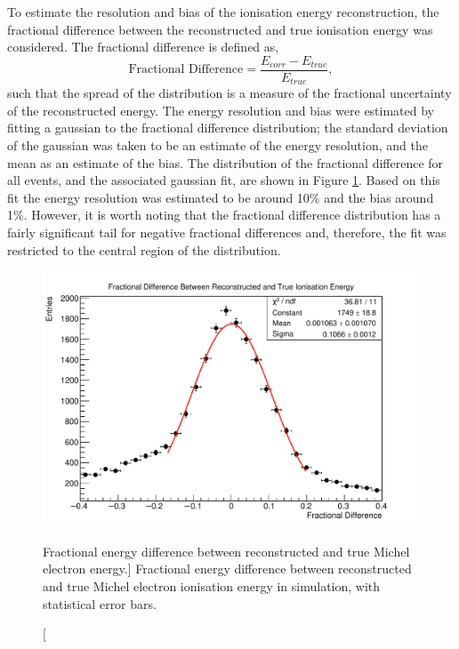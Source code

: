 To estimate the resolution and bias of the ionisation energy reconstruction, the
fractional difference between the reconstructed and true ionisation energy was
considered. The fractional difference is defined as,
\begin{equation*}
	\mbox{Fractional Difference} = \frac{E_{corr} - E_{true}}{E_{true}},
\end{equation*}
such that the spread of the distribution is a measure of the fractional
uncertainty of the reconstructed energy. The energy resolution and bias were
estimated by fitting a gaussian to the fractional difference distribution; the
standard deviation of the gaussian was taken to be an estimate of the energy
resolution, and the mean as an estimate of the bias. The distribution of the 
fractional difference for all events, and the associated gaussian fit, are 
shown in Figure \ref{fig:frac_diff_ion}. Based on this fit the energy 
resolution was estimated to be around 10\% and the bias around 1\%. However, 
it is worth noting that the fractional difference distribution has a fairly 
significant tail for negative fractional differences and, therefore, the fit 
was restricted to the central region of the distribution.
\begin{figure}
	\centering
	\includegraphics[width=\textwidth]{figures/frac_diff_ion.pdf}
	\caption
	[Fractional energy difference between reconstructed and true Michel electron
	energy.]
	{Fractional energy difference between reconstructed and true Michel electron
	ionisation energy in \protodune{} simulation, with statistical error bars.}
	\label{fig:frac_diff_ion}
\end{figure}

